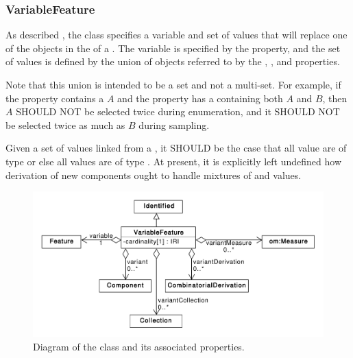 \subsubsection{VariableFeature}
\label{sec:VariableFeature}

As described , the  class specifies a variable and set of values that will replace one of the  objects in the  of a .
The variable is specified by the  property,
and the set of values is defined by the union of  objects referred to by the , , and  properties.

Note that this union is intended to be a set and not a multi-set.
For example, if the  property contains a  $A$ and the  property has a  containing both  $A$ and   $B$, then $A$ SHOULD NOT be selected twice during enumeration, and it SHOULD NOT be selected twice as much as $B$ during sampling.

Given a set of values linked from a , it SHOULD be the case that all value are of type  or else all values are of type . At present, it is explicitly left undefined how derivation of new components ought to handle mixtures of  and  values.

\begin{figure}[ht]
\begin{center}
\includegraphics[scale=0.6]{uml/variable_component}
\caption[]{Diagram of the  class and its associated properties.}
\label{uml:variable_component}
\end{center}
\end{figure}

